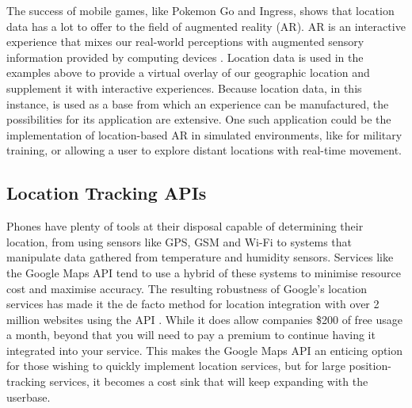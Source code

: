 The success of mobile games, like Pokemon Go and Ingress, shows that location data has a lot to offer to the field of augmented reality (AR). AR is an interactive experience that mixes our real-world perceptions with augmented sensory information provided by computing devices \cite{WilliamsII2017}. Location data is used in the examples above to provide a virtual overlay of our geographic location and supplement it with interactive experiences. Because location data, in this instance, is used as a base from which an experience can be manufactured, the possibilities for its application are extensive. One such application could be the implementation of location-based AR in simulated environments, like for military training, or allowing a user to explore distant locations with real-time movement.

\subsection{Location Tracking APIs}
Phones have plenty of tools at their disposal capable of determining their location, from using sensors like GPS, GSM and Wi-Fi to systems that manipulate data gathered from temperature and humidity sensors. Services like the Google Maps API tend to use a hybrid of these systems to minimise resource cost and maximise accuracy. The resulting robustness of Google's location services has made it the de facto method for location integration with over 2 million websites using the API \cite{BuiltWith}. While it does allow companies \$200 of free usage a month, beyond that you will need to pay a premium to continue having it integrated into your service. This makes the Google Maps API an enticing option for those wishing to quickly implement location services, but for large position-tracking services, it becomes a cost sink that will keep expanding with the userbase.

